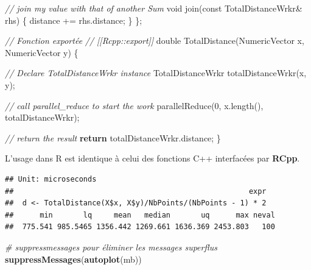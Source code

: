 \documentclass[
  12pt,
  french,
  a4paper,
  extrafontsizes,onecolumn,openright
  ]{memoir}
\newenvironment{Shaded}{\begin{snugshade}}{\end{snugshade}}
\newcommand{\AttributeTok}[1]{\textcolor[rgb]{0.77,0.63,0.00}{#1}}
\newcommand{\CommentTok}[1]{\textcolor[rgb]{0.56,0.35,0.01}{\textit{#1}}}
\newcommand{\ControlFlowTok}[1]{\textcolor[rgb]{0.13,0.29,0.53}{\textbf{#1}}}
\newcommand{\DataTypeTok}[1]{\textcolor[rgb]{0.13,0.29,0.53}{#1}}
\newcommand{\DecValTok}[1]{\textcolor[rgb]{0.00,0.00,0.81}{#1}}
\newcommand{\KeywordTok}[1]{\textcolor[rgb]{0.13,0.29,0.53}{\textbf{#1}}}
\newcommand{\NormalTok}[1]{#1}
\newcommand{\OperatorTok}[1]{\textcolor[rgb]{0.81,0.36,0.00}{\textbf{#1}}}
\newcommand{\StringTok}[1]{\textcolor[rgb]{0.31,0.60,0.02}{#1}}
\newlength{\rf}
\begin{document}
\begin{Shaded}
\begin{Highlighting}[]
  \CommentTok{// join my value with that of another Sum}
  \DataTypeTok{void}\NormalTok{ join(}\AttributeTok{const}\NormalTok{ TotalDistanceWrkr& rhs) \{ }
\NormalTok{    distance += rhs.distance; }
\NormalTok{  \}}
\NormalTok{\};}


\CommentTok{// Fonction exportée}
\CommentTok{// [[Rcpp::export]]}
\DataTypeTok{double}\NormalTok{ TotalDistance(NumericVector x, NumericVector y) \{}
  
  \CommentTok{// Declare TotalDistanceWrkr instance}
\NormalTok{  TotalDistanceWrkr totalDistanceWrkr(x, y);}
  
  \CommentTok{// call parallel_reduce to start the work}
\NormalTok{  parallelReduce(}\DecValTok{0}\NormalTok{, x.length(), totalDistanceWrkr);}
  
  \CommentTok{// return the result}
  \ControlFlowTok{return}\NormalTok{ totalDistanceWrkr.distance;}
\NormalTok{\}}
\end{Highlighting}
\end{Shaded}

\normalsize

L'usage dans R est identique à celui des fonctions C++ interfacées par \textbf{RCpp}.

\scriptsize

\begin{Shaded}
\end{Shaded}

\begin{verbatim}
## Unit: microseconds
##                                                      expr
##  d <- TotalDistance(X$x, X$y)/NbPoints/(NbPoints - 1) * 2
##      min       lq     mean   median       uq      max neval
##  775.541 985.5465 1356.442 1269.661 1636.369 2453.803   100
\end{verbatim}

\begin{Shaded}
\begin{Highlighting}[]
\CommentTok{# suppressmessages pour éliminer les messages superflus}
\KeywordTok{suppressMessages}\NormalTok{(}\KeywordTok{autoplot}\NormalTok{(mb))}
\end{Highlighting}
\end{Shaded}
\end{document}
